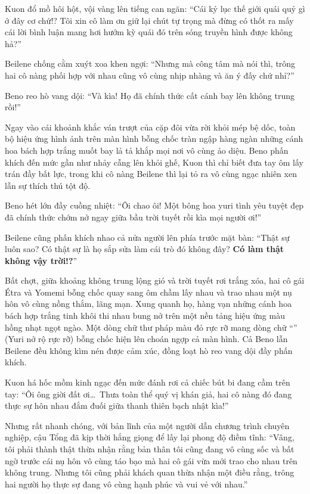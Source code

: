 \documentclass[../main.tex]{subfiles}
\begin{document}
Kuon đổ mồ hôi hột, vội vàng lên tiếng can ngăn: ``Cái kỷ lục thế giới quái quỷ gì ở đây cơ chứ!? Tôi xin cô làm ơn giữ lại chút tự trọng mà đừng có thốt ra mấy cái lời bình luận mang hơi hướm kỳ quái đó trên sóng truyền hình được không hả?''

Beilene chống cằm xuýt xoa khen ngợi: ``Nhưng mà công tâm mà nói thì, trông hai cô nàng phối hợp với nhau cũng vô cùng nhịp nhàng và ăn ý đấy chứ nhỉ?''

Beno reo hò vang dội: ``Và kìa! Họ đã chính thức cất cánh bay lên không trung rồi!''

Ngay vào cái khoảnh khắc ván trượt của cặp đôi vừa rời khỏi mép bệ dốc, toàn bộ hiệu ứng hình ảnh trên màn hình bỗng chốc tràn ngập hàng ngàn những cánh hoa bách hợp trắng muốt bay lả tả khắp mọi nơi vô cùng ảo diệu. Beno phấn khích đến mức gần như nhảy cẫng lên khỏi ghế, Kuon thì chỉ biết đưa tay ôm lấy trán đầy bất lực, trong khi cô nàng Beilene thì lại tỏ ra vô cùng ngạc nhiên xen lẫn sự thích thú tột độ.

Beno hét lớn đầy cuồng nhiệt: ``Ôi chao ôi! Một bông hoa yuri tình yêu tuyệt đẹp đã chính thức chớm nở ngay giữa bầu trời tuyết rồi kìa mọi người ơi!''

Beilene cũng phấn khích nhao cả nửa người lên phía trước mặt bàn: ``Thật sự luôn sao? Có thật sự là họ sắp sửa làm cái trò đó không đây? \textbf{Có làm thật không vậy trời!?}''

Bất chợt, giữa khoảng không trung lộng gió và trời tuyết rơi trắng xóa, hai cô gái Étra và Yomemi bỗng chốc quay sang ôm chầm lấy nhau và trao nhau một nụ hôn vô cùng nồng thắm, lãng mạn. Xung quanh họ, hàng vạn những cánh hoa bách hợp trắng tinh khôi thi nhau bung nở trên một nền tảng hiệu ứng màu hồng nhạt ngọt ngào. Một dòng chữ thư pháp màu đỏ rực rỡ mang dòng chữ ``'' (Yuri nở rộ rực rỡ) bỗng chốc hiện lên choán ngợp cả màn hình. Cả Beno lẫn Beilene đều không kìm nén được cảm xúc, đồng loạt hò reo vang dội đầy phấn khích.

Kuon há hốc mồm kinh ngạc đến mức đánh rơi cả chiếc bút bi đang cầm trên tay: ``Ôi ông giời đất ơi\dots\ Thưa toàn thể quý vị khán giả, hai cô nàng đó đang thực sự hôn nhau đắm đuối giữa thanh thiên bạch nhật kìa!''

Nhưng rất nhanh chóng, với bản lĩnh của một người dẫn chương trình chuyên nghiệp, cậu Tổng đã kịp thời hắng giọng để lấy lại phong độ điềm tĩnh: ``Vâng, tôi phải thành thật thừa nhận rằng bản thân tôi cũng đang vô cùng sốc và bất ngờ trước cái nụ hôn vô cùng táo bạo mà hai cô gái vừa mới trao cho nhau trên không trung. Nhưng tôi cũng phải khách quan thừa nhận một điều rằng, trông hai người họ thực sự đang vô cùng hạnh phúc và vui vẻ với nhau.''
\end{document}
